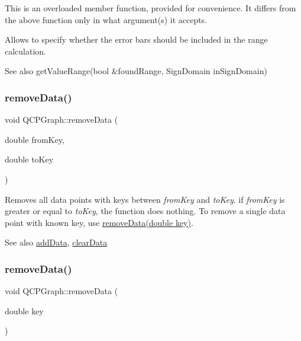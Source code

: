 This is an overloaded member function, provided for convenience. It differs from the above function only in what argument(s) it accepts.

Allows to specify whether the error bars should be included in the range calculation.

\begin{DoxySeeAlso}{See also}
get\+Value\+Range(bool \&found\+Range, Sign\+Domain in\+Sign\+Domain) 
\end{DoxySeeAlso}
\hypertarget{class_q_c_p_graph_a4a0fde50b7db9db0a85b5c5b6b10098f}{}\label{class_q_c_p_graph_a4a0fde50b7db9db0a85b5c5b6b10098f} 
\subsubsection{\texorpdfstring{remove\+Data()}{removeData()}\hspace{0.1cm}{\footnotesize\ttfamily [1/2]}}
{\footnotesize\ttfamily void Q\+C\+P\+Graph\+::remove\+Data (\begin{DoxyParamCaption}\item[{double}]{from\+Key,  }\item[{double}]{to\+Key }\end{DoxyParamCaption})}

Removes all data points with keys between {\itshape from\+Key} and {\itshape to\+Key}. if {\itshape from\+Key} is greater or equal to {\itshape to\+Key}, the function does nothing. To remove a single data point with known key, use \hyperlink{class_q_c_p_graph_a4a706020b4318f118381648ef18aca3f}{remove\+Data(double key)}.

\begin{DoxySeeAlso}{See also}
\hyperlink{class_q_c_p_graph_aa5c6181d84db72ce4dbe9dc15a34ef4f}{add\+Data}, \hyperlink{class_q_c_p_graph_ad4e94a4e44e5e76fbec81a72a977157d}{clear\+Data} 
\end{DoxySeeAlso}
\hypertarget{class_q_c_p_graph_a4a706020b4318f118381648ef18aca3f}{}\label{class_q_c_p_graph_a4a706020b4318f118381648ef18aca3f} 
\subsubsection{\texorpdfstring{remove\+Data()}{removeData()}\hspace{0.1cm}{\footnotesize\ttfamily [2/2]}}
{\footnotesize\ttfamily void Q\+C\+P\+Graph\+::remove\+Data (\begin{DoxyParamCaption}\item[{double}]{key }\end{DoxyParamCaption})}

